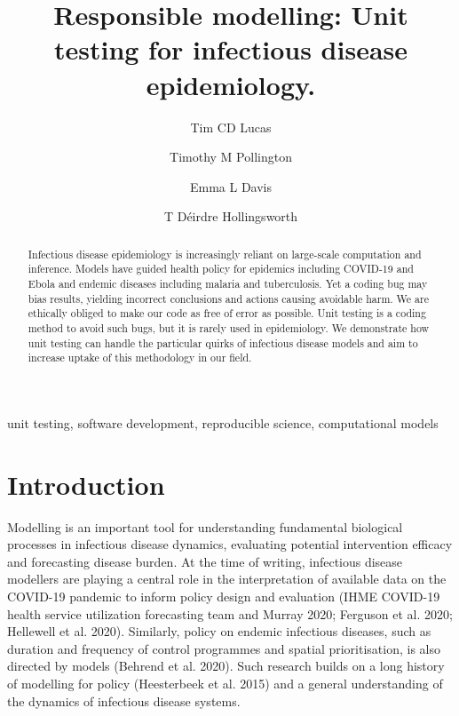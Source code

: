 \documentclass[]{elsarticle} %
\begin{document}
\begin{frontmatter}

  \title{Responsible modelling: Unit testing for infectious disease epidemiology.}
    \author[Big Data Institute]{Tim CD Lucas}
    \author[Big Data Institute]{Timothy M Pollington}
  
    \author[Big Data Institute]{Emma L Davis}
  
    \author[Big Data Institute]{T Déirdre Hollingsworth}
  
      \address[Big Data Institute]{Big Data Institute, Li Ka Shing Centre for Health Information and Discovery, University of Oxford, UK}
    \address[Imperial]{Centre for Environment and Health, School of Public Health, Imperial College, UK}
    \address[MathSys CDT]{MathSys CDT, University of Warwick, UK}
    
  \begin{abstract}
  Infectious disease epidemiology is increasingly reliant on large-scale computation and inference.
  Models have guided health policy for epidemics including COVID-19 and Ebola and endemic diseases including malaria and tuberculosis.
  Yet a coding bug may bias results, yielding incorrect conclusions and actions causing avoidable harm.
  We are ethically obliged to make our code as free of error as possible.
  Unit testing is a coding method to avoid such bugs, but it is rarely used in epidemiology.
  We demonstrate how unit testing can handle the particular quirks of infectious disease models and aim to increase uptake of this methodology in our field.
  \end{abstract}
   \begin{keyword} unit testing, software development, reproducible science, computational models\end{keyword}
 \end{frontmatter}

\newpage

\hypertarget{introduction}{%
\section{Introduction}\label{introduction}}

\linenumbers

Modelling is an important tool for understanding fundamental biological processes in infectious disease dynamics, evaluating potential intervention efficacy and forecasting disease burden.
At the time of writing, infectious disease modellers are playing a central role in the interpretation of available data on the COVID-19 pandemic to inform policy design and evaluation (IHME COVID-19 health service utilization forecasting team and Murray 2020; Ferguson et al. 2020; Hellewell et al. 2020).
Similarly, policy on endemic infectious diseases, such as duration and frequency of control programmes and spatial prioritisation, is also directed by models (Behrend et al. 2020).
Such research builds on a long history of modelling for policy (Heesterbeek et al. 2015) and a general understanding of the dynamics of infectious disease systems.
\end{document}
